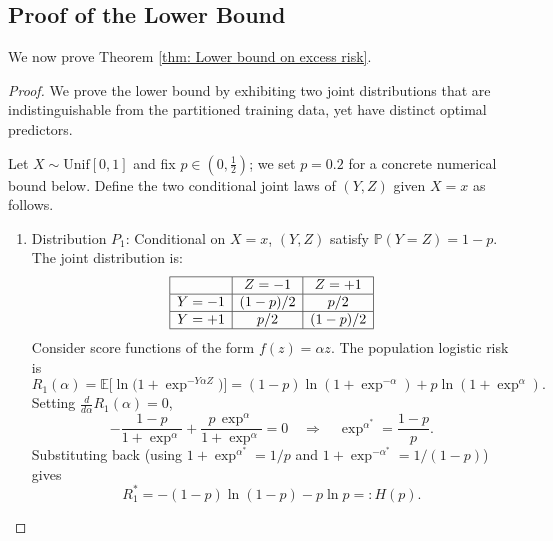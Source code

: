 \subsection{Proof of the Lower Bound}\label{subsec: proof of lower bound}

We now prove Theorem \ref{thm: Lower bound on excess risk}.

\begin{proof}
    We prove the lower bound by exhibiting two joint distributions that are indistinguishable from the partitioned training data, yet have distinct optimal predictors.

    Let $X \sim \mathrm{Unif}[0,1]$ and fix $p \in (0,\tfrac{1}{2})$; we set $p = 0.2$ for a concrete numerical bound below. Define the two conditional joint laws of $(Y,Z)$ given $X = x$ as follows.

    \begin{enumerate}
        \item[(I)] Distribution $P_1$:
         Conditional on $X=x$, $(Y,Z)$ satisfy $\mathbb{P}(Y = Z) = 1-p$. The joint distribution is:
         \begin{equation*}
             \begin{array}{|c|c|c|}
                 \hline
                 & Z=-1 & Z=+1 \\
                 \hline
                 Y=-1 & (1-p)/2 & p/2 \\
                 \hline
                 Y=+1 & p/2 & (1-p)/2 \\
                 \hline
             \end{array}
         \end{equation*}
         Consider score functions of the form $f(z) = \alpha z$. The population logistic risk is
         \begin{equation*}
             R_1(\alpha) = \mathbb{E}\big[\ln\!\big(1 + \exp^{-Y\alpha Z}\big)\big]
             = (1-p)\ln(1+\exp^{-\alpha}) + p\ln(1+\exp^{\alpha}).
         \end{equation*}
          Setting $\frac{d}{d\alpha}R_1(\alpha) = 0$,
         \begin{equation*}
             -\frac{1-p}{1+\exp^{\alpha}} + \frac{p\,\exp^{\alpha}}{1+\exp^{\alpha}} = 0
             \quad\Longrightarrow\quad
             \exp^{\alpha^*} = \frac{1-p}{p}.
         \end{equation*}
         Substituting back (using $1 + \exp^{\alpha^*} = 1/p$ and $1 + \exp^{-\alpha^*} = 1/(1-p)$) gives
         \begin{equation*}
             R_1^* = -(1-p)\ln(1-p) - p\ln p =: H(p).
         \end{equation*}
 

\end{enumerate}
\end{proof}
